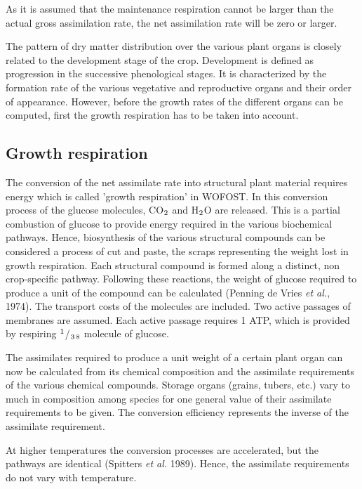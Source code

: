 As it is assumed that the maintenance respiration cannot be larger than the actual gross 
assimilation rate, the net assimilation rate will be zero or larger.

The pattern of dry matter distribution over the various plant organs is closely related to
the development stage of the crop. Development is defined as progression in the successive 
phenological stages. It is characterized by the formation rate of the various vegetative
and reproductive organs and their order of appearance. However, before the growth rates
of the different organs can be computed, first the growth respiration has to be taken into account.

\subsection{Growth respiration}

The conversion of the net assimilate rate into structural plant material requires energy which is
called 'growth respiration' in WOFOST.
In this conversion process of the glucose molecules, CO$_{{\rm 2}}$ and
H$_{{\rm 2}}$O are released. This is a partial combustion of glucose to provide energy required in
the various biochemical pathways. Hence, biosynthesis of the various structural compounds can 
be considered a process of cut and paste, the scraps representing the weight
lost in growth respiration.
Each structural compound is formed along a distinct, non crop-specific pathway.
Following these reactions, the weight of glucose required to produce a unit of the
compound can be calculated (Penning de Vries {\it et al.}, 1974). The transport costs of the
molecules are included. Two active passages of membranes are assumed. Each active
passage requires 1 ATP, which is provided by respiring $^{{\rm 1}}$/$_{{\rm 3}}$$_{{\rm 8}}$ molecule of glucose.

The assimilates required to produce a unit weight of a certain plant organ can now be
calculated from its chemical composition and the assimilate requirements of the various
chemical compounds. Storage organs (grains, tubers, etc.) vary to much in composition
among species for one general value of their assimilate requirements to be given. The
conversion efficiency represents the inverse of the assimilate requirement.

At higher temperatures the conversion processes are accelerated, but the pathways are
identical (Spitters {\it et al.} 1989). Hence, the assimilate requirements do not vary with
temperature. 


